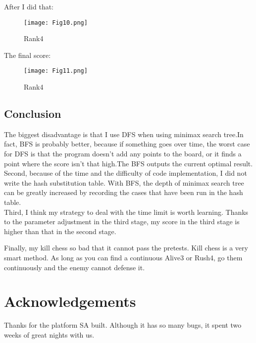 \documentclass[10pt,twocolumn,letterpaper]{article}
\begin{document}
After I did that:

\begin{figure}[H]
  \centering
  \texttt{[image: Fig10.png]}\\
  \caption{Rank4
}\label{straddltimeScale}
\end{figure}

The final score:

\begin{figure}[H]
  \centering
  \texttt{[image: Fig11.png]}\\
  \caption{Rank4
}\label{straddltimeScale}
\end{figure}

\subsection{Conclusion}
The biggest disadvantage is that I use DFS when using minimax search tree.In fact, BFS is probably better, because if something goes over time, the worst case for DFS is that the program doesn't add any points to the board, or it finds a point where the score isn't that high.The BFS outputs the current optimal result.\\

Second, because of the time and the difficulty of code implementation, I did not write the hash substitution table. With BFS, the depth of minimax search tree can be greatly increased by recording the cases that have been run in the hash table.\\

Third, I think my strategy to deal with the time limit is worth learning. Thanks to the parameter adjustment in the third stage, my score in the third stage is higher than that in the second stage.

Finally, my kill chess so bad that it cannot pass the pretests. Kill chess is a very smart method. As long as you can find a continuous Alive3 or Rush4, go them continuously and the enemy cannot defense it.

\section*{Acknowledgements}
Thanks for the platform SA built. Although it has so many bugs, it spent two weeks of great nights with us.



\end{document}
